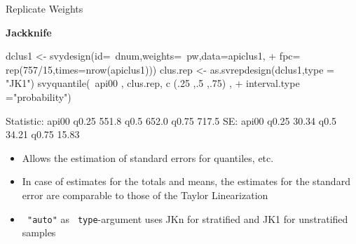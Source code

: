 \documentclass[11pt,german,hideothersubsections]{beamer}
\newcommand{\R}[1]{{\tt \color{blue}  #1}}
\begin{document}
\begin{frame}[fragile]{Replicate Weights}
\footnotesize{
\begin{center}
\textbf{Jackknife}
\end{center}
\begin{Schunk}
\begin{Sinput}
 dclus1 <- svydesign(id=~dnum,weights=~pw,data=apiclus1,
+                     fpc= rep(757/15,times=nrow(apiclus1)))
 clus.rep <- as.svrepdesign(dclus1,type = "JK1")
 svyquantile(~api00 , clus.rep, c (.25 ,.5 ,.75) ,
+             interval.type ="probability")
\end{Sinput}
\begin{Soutput}
Statistic:
      api00
q0.25 551.8
q0.5  652.0
q0.75 717.5
SE:
      api00
q0.25 30.34
q0.5  34.21
q0.75 15.83
\end{Soutput}
\end{Schunk}
\begin{itemize}
\item Allows the estimation of standard errors for quantiles, etc.
\item In case of estimates for the totals and means, the estimates for the standard error are comparable to those of the Taylor Linearization
\item \R{"auto"} as \R{type}-argument uses JKn for stratified and JK1 for unstratified samples
\end{itemize}


}
\end{frame}
\end{document}
